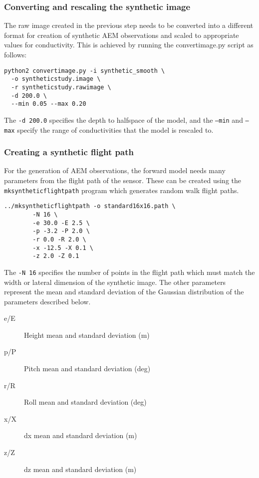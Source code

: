 \documentclass[a4paper,12pt]{article}
\begin{document}
\subsubsection{Converting and rescaling the synthetic image}

The raw image created in the previous step needs to be converted
into a different format for creation of synthetic AEM observations
and scaled to appropriate values for conductivity. This is
achieved by running the convertimage.py script as follows:

\begin{verbatim}
python2 convertimage.py -i synthetic_smooth \
  -o syntheticstudy.image \
  -r syntheticstudy.rawimage \
  -d 200.0 \
  --min 0.05 --max 0.20
\end{verbatim}

The {\tt -d 200.0} specifies the depth to halfspace of the
model, and the {\tt --min} and {\tt --max} specify the
range of conductivities that the model is rescaled to.

\subsubsection{Creating a synthetic flight path}

For the generation of AEM observations, the forward model
needs many parameters from the flight path of the sensor.
These can be created using the {\tt mksyntheticflightpath}
program which generates random walk flight paths.

\begin{verbatim}
../mksyntheticflightpath -o standard16x16.path \
        -N 16 \
        -e 30.0 -E 2.5 \
        -p -3.2 -P 2.0 \
        -r 0.0 -R 2.0 \
        -x -12.5 -X 0.1 \
        -z 2.0 -Z 0.1
\end{verbatim}

The {\tt -N 16} specifies the number of points in the flight path
which must match the width or lateral dimension of the synthetic
image. The other parameters represent the mean and standard deviation
of the Gaussian distribution of the parameters described below.

\begin{description}
\item[e/E] Height mean and standard deviation (m)
\item[p/P] Pitch mean and standard deviation (deg)
\item[r/R] Roll mean and standard deviation (deg)
\item[x/X] dx mean and standard deviation (m)
\item[z/Z] dz mean and standard deviation (m)
\end{description}
\end{document}
